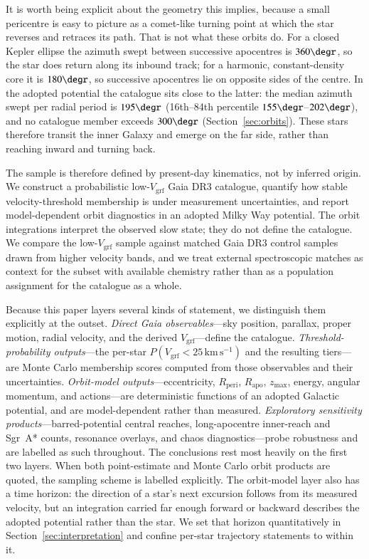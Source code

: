 \documentclass{aa}  %
\newcommand{\vgrf}{\ensuremath{V_{\mathrm{grf}}}\xspace}
\newcommand{\kms}{\ensuremath{\,\mathrm{km\,s^{-1}}}\xspace}
\newcommand{\Rperi}{R_{\mathrm{peri}}}
\newcommand{\Rapo}{R_{\mathrm{apo}}}
\newcommand{\zmax}{z_{\mathrm{max}}}
\begin{document}
It is worth being explicit about the geometry this implies, because a
small pericentre is easy to picture as a comet-like turning point at
which the star reverses and retraces its path.  That is not what these
orbits do.  For a closed Kepler ellipse the azimuth swept between
successive apocentres is $360\degr$, so the star does return along its
inbound track; for a harmonic, constant-density core it is $180\degr$,
so successive apocentres lie on opposite sides of the centre.  In the
adopted potential the catalogue sits close to the latter: the median
azimuth swept per radial period is $195\degr$ (16th--84th percentile
$155\degr$--$202\degr$), and no catalogue member exceeds $300\degr$
(Section~\ref{sec:orbits}).  These stars therefore transit the inner
Galaxy and emerge on the far side, rather than reaching inward and
turning back.

The sample is therefore defined by present-day kinematics, not by
inferred origin.  We construct a probabilistic low-\vgrf{} Gaia DR3
catalogue, quantify how stable velocity-threshold membership is under
measurement uncertainties, and report model-dependent orbit diagnostics
in an adopted Milky Way potential.  The orbit integrations interpret the
observed slow state; they do not define the catalogue.  We compare the
low-\vgrf{} sample against matched Gaia DR3 control samples drawn from
higher velocity bands, and we treat external spectroscopic matches as
context for the subset with available chemistry rather than as a
population assignment for the catalogue as a whole.

Because this paper layers several kinds of statement, we distinguish them
explicitly at the outset.  \emph{Direct Gaia observables}---sky position,
parallax, proper motion, radial velocity, and the derived $\vgrf$---define
the catalogue.  \emph{Threshold-probability outputs}---the per-star
$P(\vgrf<25\kms)$ and the resulting tiers---are Monte Carlo membership
scores computed from those observables and their uncertainties.
\emph{Orbit-model outputs}---eccentricity, $\Rperi$, $\Rapo$, $\zmax$,
energy, angular momentum, and actions---are deterministic functions of an
adopted Galactic potential, and are model-dependent rather than measured.
\emph{Exploratory sensitivity products}---barred-potential central
reaches, long-apocentre inner-reach and Sgr~A* counts, resonance overlays, and chaos
diagnostics---probe robustness and are labelled as such throughout.  The
conclusions rest most heavily on the first two layers.  When both
point-estimate and Monte Carlo orbit products are quoted, the sampling
scheme is labelled explicitly.  The orbit-model layer also has a time
horizon: the direction of a star's next excursion follows from its
measured velocity, but an integration carried far enough forward or
backward describes the adopted potential rather than the star.  We set
that horizon quantitatively in Section~\ref{sec:interpretation} and
confine per-star trajectory statements to within it.
\end{document}
